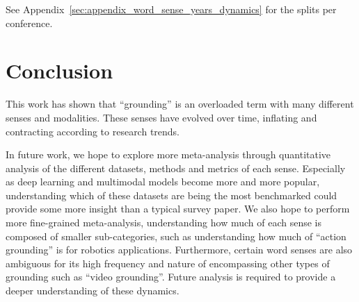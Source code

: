 \documentclass[11pt]{article}
\begin{document}
See Appendix~\ref{sec:appendix_word_sense_years_dynamics} for the splits per conference.


\section{Conclusion}
This work has shown that ``grounding'' is an overloaded term with many different senses and modalities. These senses have evolved over time, inflating and contracting according to research trends.

In future work, we hope to explore more meta-analysis through quantitative analysis of the different datasets, methods and metrics of each sense. Especially as deep learning and multimodal models become more and more popular, understanding which of these datasets are being the most benchmarked could provide some more insight than a typical survey paper. We also hope to perform more fine-grained meta-analysis, understanding how much of each sense is composed of smaller sub-categories, such as understanding how much of ``action grounding'' is for robotics applications. Furthermore, certain word senses are also ambiguous for its high frequency and nature of encompassing other types of grounding such as ``video grounding''. Future analysis is required to provide a deeper understanding of these dynamics.




\end{document}
